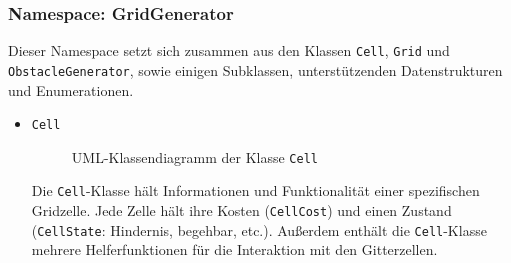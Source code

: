 \subsubsection{Namespace: GridGenerator}
\label{subsubsec:aufbau_backend_ueberblick_gridgen}
Dieser Namespace setzt sich zusammen aus den Klassen \texttt{Cell}, \texttt{Grid} und \texttt{Obstacle\-Generator}, sowie einigen Subklassen, unterstützenden Datenstrukturen und Enumerationen.
\newpage
\begin{itemize}
    \item \texttt{Cell} \\
    \begin{figure}[H]
        \vspace{-0.5cm}
        \centering
        
        \caption{UML-Klassendiagramm der Klasse \texttt{Cell}}
        \label{fig:uml_cell}
    \end{figure}
    Die \texttt{Cell}-Klasse hält Informationen und Funktionalität einer spezifischen Gridzelle.
    Jede Zelle hält ihre Kosten (\texttt{CellCost}) und einen Zustand (\texttt{Cell\-State}: Hindernis, begehbar, etc.).
    Außerdem enthält die \texttt{Cell}-Klasse mehrere Helferfunktionen für die Interaktion mit den Gitterzellen.


\end{itemize}

